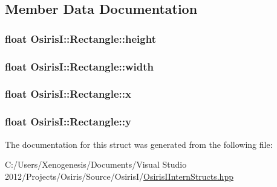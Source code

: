\subsection{Member Data Documentation}
\hypertarget{struct_osiris_i_1_1_rectangle_a6f8a7c1aea83c02835271bd5f7c57352}{
\subsubsection[{height}]{\setlength{\rightskip}{0pt plus 5cm}float Osiris\-I\-::\-Rectangle\-::height}}\label{struct_osiris_i_1_1_rectangle_a6f8a7c1aea83c02835271bd5f7c57352}
\hypertarget{struct_osiris_i_1_1_rectangle_a09997c8ac54820b7f45b755df0f4c46e}{
\subsubsection[{width}]{\setlength{\rightskip}{0pt plus 5cm}float Osiris\-I\-::\-Rectangle\-::width}}\label{struct_osiris_i_1_1_rectangle_a09997c8ac54820b7f45b755df0f4c46e}
\hypertarget{struct_osiris_i_1_1_rectangle_abeee4a4556d9a3b615e7bf1566d0e1ed}{
\subsubsection[{x}]{\setlength{\rightskip}{0pt plus 5cm}float Osiris\-I\-::\-Rectangle\-::x}}\label{struct_osiris_i_1_1_rectangle_abeee4a4556d9a3b615e7bf1566d0e1ed}
\hypertarget{struct_osiris_i_1_1_rectangle_a67a96f18272cf2f99c25024168930931}{
\subsubsection[{y}]{\setlength{\rightskip}{0pt plus 5cm}float Osiris\-I\-::\-Rectangle\-::y}}\label{struct_osiris_i_1_1_rectangle_a67a96f18272cf2f99c25024168930931}


The documentation for this struct was generated from the following file\-:\begin{DoxyCompactItemize}
\item 
C\-:/\-Users/\-Xenogenesis/\-Documents/\-Visual Studio 2012/\-Projects/\-Osiris/\-Source/\-Osiris\-I/\hyperlink{_osiris_i_intern_structs_8hpp}{Osiris\-I\-Intern\-Structs.\-hpp}\end{DoxyCompactItemize}
